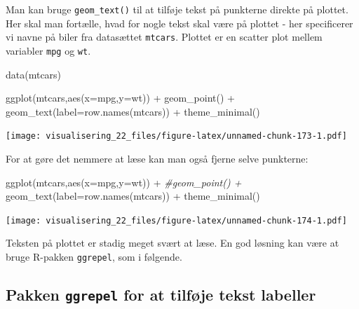 \documentclass[
]{book}
\newenvironment{Shaded}{\begin{snugshade}}{\end{snugshade}}
\newcommand{\AttributeTok}[1]{\textcolor[rgb]{0.77,0.63,0.00}{#1}}
\newcommand{\CommentTok}[1]{\textcolor[rgb]{0.56,0.35,0.01}{\textit{#1}}}
\newcommand{\FunctionTok}[1]{\textcolor[rgb]{0.00,0.00,0.00}{#1}}
\newcommand{\NormalTok}[1]{#1}
\newcommand{\SpecialCharTok}[1]{\textcolor[rgb]{0.00,0.00,0.00}{#1}}
\begin{document}
Man kan bruge \texttt{geom\_text()} til at tilføje tekst på punkterne direkte på plottet. Her skal man fortælle, hvad for nogle tekst skal være på plottet - her specificerer vi navne på biler fra datasættet \texttt{mtcars}. Plottet er en scatter plot mellem variabler \texttt{mpg} og \texttt{wt}.

\begin{Shaded}
\begin{Highlighting}[]
\FunctionTok{data}\NormalTok{(mtcars)}

\FunctionTok{ggplot}\NormalTok{(mtcars,}\FunctionTok{aes}\NormalTok{(}\AttributeTok{x=}\NormalTok{mpg,}\AttributeTok{y=}\NormalTok{wt)) }\SpecialCharTok{+} 
  \FunctionTok{geom\_point}\NormalTok{() }\SpecialCharTok{+}
  \FunctionTok{geom\_text}\NormalTok{(}\AttributeTok{label=}\FunctionTok{row.names}\NormalTok{(mtcars)) }\SpecialCharTok{+} 
  \FunctionTok{theme\_minimal}\NormalTok{()}
\end{Highlighting}
\end{Shaded}

\texttt{[image: visualisering\_22\_files/figure-latex/unnamed-chunk-173-1.pdf]}

For at gøre det nemmere at læse kan man også fjerne selve punkterne:

\begin{Shaded}
\begin{Highlighting}[]
\FunctionTok{ggplot}\NormalTok{(mtcars,}\FunctionTok{aes}\NormalTok{(}\AttributeTok{x=}\NormalTok{mpg,}\AttributeTok{y=}\NormalTok{wt)) }\SpecialCharTok{+} 
  \CommentTok{\#geom\_point() +}
  \FunctionTok{geom\_text}\NormalTok{(}\AttributeTok{label=}\FunctionTok{row.names}\NormalTok{(mtcars)) }\SpecialCharTok{+} 
  \FunctionTok{theme\_minimal}\NormalTok{()}
\end{Highlighting}
\end{Shaded}

\texttt{[image: visualisering\_22\_files/figure-latex/unnamed-chunk-174-1.pdf]}

Teksten på plottet er stadig meget svært at læse. En god løsning kan være at bruge R-pakken \texttt{ggrepel}, som i følgende.

\hypertarget{pakken-ggrepel-for-at-tilfuxf8je-tekst-labeller}{%
\subsection{\texorpdfstring{Pakken \texttt{ggrepel} for at tilføje tekst labeller}{Pakken ggrepel for at tilføje tekst labeller}}\label{pakken-ggrepel-for-at-tilfuxf8je-tekst-labeller}}
\end{document}
